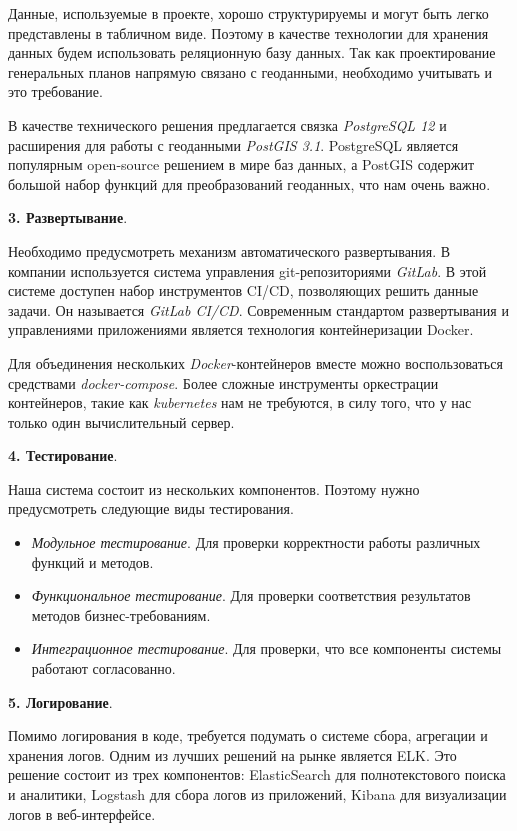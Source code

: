 Данные, используемые в проекте, хорошо структурируемы и могут быть легко представлены в табличном виде.
Поэтому в качестве технологии для хранения данных будем использовать реляционную базу данных.
Так как проектирование генеральных планов напрямую связано с геоданными, необходимо учитывать и это требование.

В качестве технического решения предлагается связка \textit{PostgreSQL 12} и расширения для работы с геоданными
\textit{PostGIS 3.1}. PostgreSQL является популярным open-source решением в мире баз данных,
а PostGIS содержит большой набор функций для преобразований геоданных, что нам очень важно\cite{PostGIS}.

\noindent \textbf{3. Развертывание}.

Необходимо предусмотреть механизм автоматического развертывания.
В компании используется система управления git-репозиториями \textit{GitLab}.
В этой системе доступен набор инструментов CI/CD, позволяющих решить данные задачи. Он называется \textit{GitLab CI/CD}.
Современным стандартом развертывания и управлениями приложениями является технология контейнеризации
Docker\cite{Docker}.

Для объединения нескольких \textit{Docker}-контейнеров вместе можно воспользоваться средствами \textit{docker-compose}.
Более сложные инструменты оркестрации контейнеров, такие как \textit{kubernetes} нам не требуются, в силу того, что у нас
только один вычислительный сервер.

\noindent \textbf{4. Тестирование}.

Наша система состоит из нескольких компонентов. Поэтому нужно предусмотреть следующие виды тестирования\cite{ArtOfTesting}.
\begin{itemize}
    \item \textit{Модульное тестирование}. Для проверки корректности работы различных функций и методов.
    \item \textit{Функциональное тестирование}. Для проверки соответствия результатов методов бизнес-требованиям.
    \item \textit{Интеграционное тестирование}. Для проверки, что все компоненты системы работают согласованно.
\end{itemize}

\noindent \textbf{5. Логирование}.

Помимо логирования в коде, требуется подумать о системе сбора, агрегации и хранения логов.
Одним из лучших решений на рынке является ELK. Это решение состоит из трех компонентов: ElasticSearch для полнотекстового
поиска и аналитики, Logstash для сбора логов из приложений, Kibana для визуализации логов в веб-интерфейсе.

